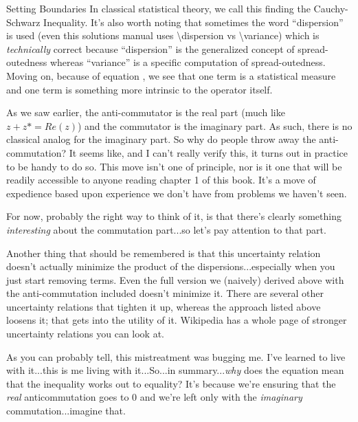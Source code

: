 \begin{answer}
\begin{answerpart}{Setting Boundaries}
    In classical statistical theory, we call this finding the
    Cauchy-Schwarz
    Inequality. It's also
    worth noting that sometimes the word ``dispersion'' is used (even
    this solutions manual uses \textbackslash dispersion vs
    \textbackslash variance) which is \emph{technically} correct
    because ``dispersion'' is the generalized concept of
    spread-outedness whereas ``variance'' is a specific computation of
    spread-outedness.  Moving on, because of equation
    , we see that one term is a statistical measure
    and one term is something more intrinsic to the operator itself.

    As we saw earlier, the anti-commutator is the real part (much like
    $z + z* = Re(z)$) and the commutator is the imaginary part.  As
    such, there is no classical analog for the imaginary part.  So why
    do people throw away the anti-commutation?  It seems like, and I
    can't really verify this, it turns out in practice to be handy to
    do so.  This move isn't one of principle, nor is it one that will
    be readily accessible to anyone reading chapter 1 of this book.
    It's a move of expedience based upon experience we don't have from
    problems we haven't seen.

    For now, probably the right way to think of it, is that there's
    clearly something \emph{interesting} about the commutation
    part...so let's pay attention to that part.

    Another thing that should be remembered is that this uncertainty
    relation doesn't actually minimize the product of the
    dispersions...especially when you just start removing terms.  Even
    the full version we (naively) derived above with the
    anti-commutation included doesn't minimize it.  There are several
    other uncertainty relations that tighten it up, whereas the
    approach listed above loosens it; that gets into the utility of
    it.  Wikipedia has a whole page of stronger uncertainty relations
    you can look at.
 
    As you can probably tell, this mistreatment was bugging me.  I've
    learned to live with it...this is me living with it...So...in
    summary...\emph{why} does the equation  mean that
    the inequality works out to equality?  It's because we're ensuring
    that the \emph{real} anticommutation goes to 0 and we're left only
    with the \emph{imaginary} commutation...imagine that.
  \end{answerpart}


\end{answer}
